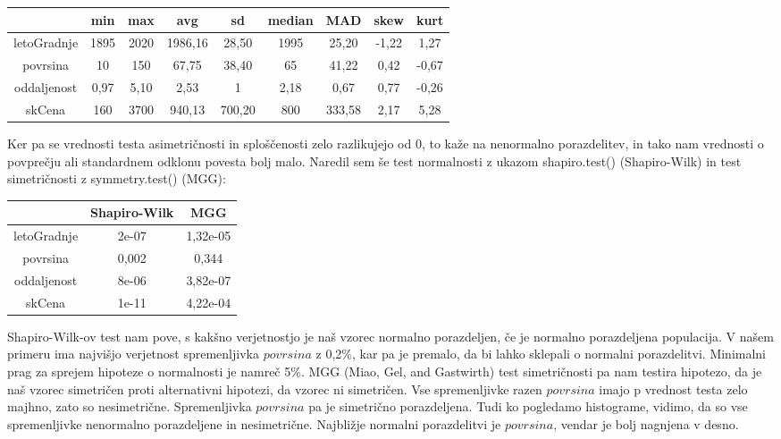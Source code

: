 \documentclass[a4paper, 12pt]{article}
\begin{document}
\begin{center}
\begin{tabular}{ c|cccccccc }
	& min & max & avg & sd & median & MAD & skew & kurt \\
	\hline
	letoGradnje & 1895 & 2020 & 1986,16 & 28,50 & 1995 & 25,20 & -1,22 & 1,27 \\
	povrsina & 10 & 150 & 67,75 & 38,40 & 65 & 41,22 & 0,42 & -0,67 \\
	oddaljenost & 0,97 & 5,10 & 2,53 & 1 & 2,18 & 0,67 & 0,77 & -0,26 \\
	skCena & 160 & 3700 & 940,13 & 700,20 & 800 & 333,58 & 2,17 & 5,28 \\
\end{tabular}
\end{center}
Ker pa se vrednosti testa asimetričnosti in sploščenosti zelo razlikujejo
od $ 0 $, to kaže na nenormalno porazdelitev, in tako nam vrednosti o povprečju
ali standardnem odklonu povesta bolj malo. Naredil sem še test normalnosti z
ukazom {\sf shapiro.test()} (Shapiro-Wilk) in test simetričnosti z
{\sf symmetry.test()} (MGG):

\begin{center}
\begin{tabular}{ c|c|c }
	& Shapiro-Wilk & MGG \\
	\hline
	letoGradnje & 2e-07 & 1,32e-05 \\
	povrsina & 0,002 & 0,344 \\
	oddaljenost & 8e-06 & 3,82e-07 \\
	skCena & 1e-11 & 4,22e-04 \\
\end{tabular}
\end{center}
Shapiro-Wilk-ov test nam pove, s kakšno verjetnostjo je naš vzorec normalno
porazdeljen, če je normalno porazdeljena populacija. V našem primeru ima
najvišjo verjetnost spremenljivka $ povrsina $ z 0,2\%, kar pa je premalo,
da bi lahko sklepali o normalni porazdelitvi. Minimalni prag za sprejem
hipoteze o normalnosti je namreč 5\%.
\newline
MGG (Miao, Gel, and Gastwirth) test simetričnosti pa nam testira hipotezo, da
je naš vzorec simetričen proti alternativni hipotezi, da vzorec ni simetričen.
Vse spremenljivke razen $ povrsina $ imajo p vrednost testa zelo majhno,
zato so nesimetrične. Spremenljivka $ povrsina $ pa je simetrično
porazdeljena.
\newline
Tudi ko pogledamo histograme, vidimo, da so vse spremenljivke nenormalno
porazdeljene in nesimetrične. Najbližje normalni porazdelitvi je
$ povrsina $, vendar je bolj nagnjena v desno.
\end{document}
